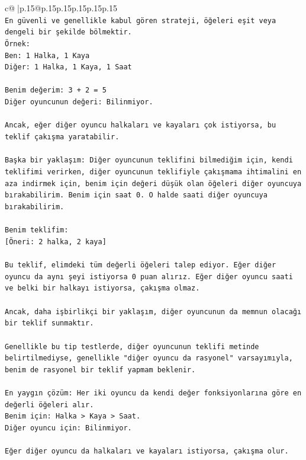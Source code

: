 \documentclass{article}
\begin{document}
{\begin{supertabular}{c@{$\;$}|p{.15\linewidth}@{}p{.15\linewidth}p{.15\linewidth}p{.15\linewidth}p{.15\linewidth}p{.15\linewidth}}
{{{\\ 
\texttt{En güvenli ve genellikle kabul gören strateji, öğeleri eşit veya dengeli bir şekilde bölmektir.} \\
\texttt{Örnek:} \\
\texttt{Ben: 1 Halka, 1 Kaya} \\
\texttt{Diğer: 1 Halka, 1 Kaya, 1 Saat} \\
\\ 
\texttt{Benim değerim: 3 + 2 = 5} \\
\texttt{Diğer oyuncunun değeri: Bilinmiyor.} \\
\\ 
\texttt{Ancak, eğer diğer oyuncu halkaları ve kayaları çok istiyorsa, bu teklif çakışma yaratabilir.} \\
\\ 
\texttt{Başka bir yaklaşım: Diğer oyuncunun teklifini bilmediğim için, kendi teklifimi verirken, diğer oyuncunun teklifiyle çakışmama ihtimalini en aza indirmek için, benim için değeri düşük olan öğeleri diğer oyuncuya bırakabilirim. Benim için saat 0. O halde saati diğer oyuncuya bırakabilirim.} \\
\\ 
\texttt{Benim teklifim:} \\
\texttt{{[}Öneri: 2 halka, 2 kaya{]}} \\
\\ 
\texttt{Bu teklif, elimdeki tüm değerli öğeleri talep ediyor. Eğer diğer oyuncu da aynı şeyi istiyorsa 0 puan alırız. Eğer diğer oyuncu saati ve belki bir halkayı istiyorsa, çakışma olmaz.} \\
\\ 
\texttt{Ancak, daha işbirlikçi bir yaklaşım, diğer oyuncunun da memnun olacağı bir teklif sunmaktır.} \\
\\ 
\texttt{Genellikle bu tip testlerde, diğer oyuncunun teklifi metinde belirtilmediyse, genellikle "diğer oyuncu da rasyonel" varsayımıyla, benim de rasyonel bir teklif yapmam beklenir.} \\
\\ 
\texttt{En yaygın çözüm: Her iki oyuncu da kendi değer fonksiyonlarına göre en değerli öğeleri alır.} \\
\texttt{Benim için: Halka > Kaya > Saat.} \\
\texttt{Diğer oyuncu için: Bilinmiyor.} \\
\\ 
\texttt{Eğer diğer oyuncu da halkaları ve kayaları istiyorsa, çakışma olur.} \\
}}}
\end{supertabular}}
\end{document}
